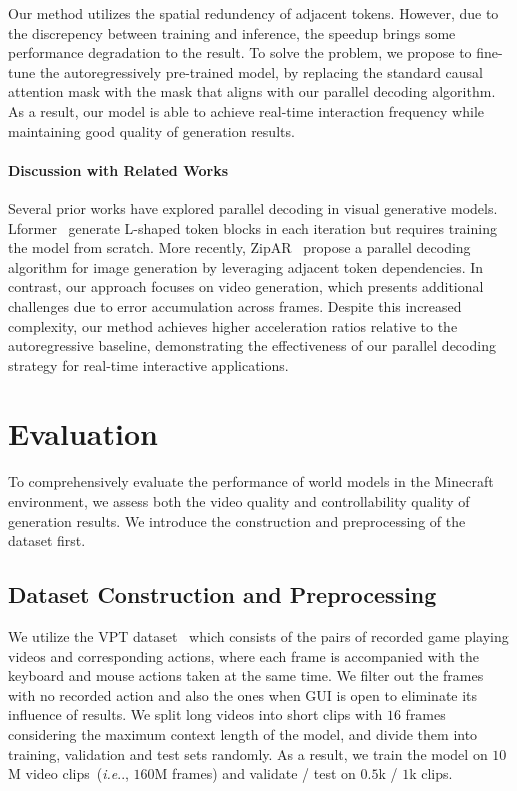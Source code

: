 \documentclass{article} %
\makeatletter
\DeclareRobustCommand\onedot{\futurelet\@let@token\@onedot}
\def\@onedot{\ifx\@let@token.\else.\null\fi\xspace}
\def\ie{\emph{i.e}\onedot} \def\Ie{\emph{I.e}\onedot}
\makeatother
\begin{document}
Our method utilizes the spatial redundency of adjacent tokens. However, due to the discrepency between training and inference, the speedup brings some performance degradation to the result. To solve the problem, we propose to fine-tune the autoregressively pre-trained model, by replacing the standard causal attention mask with the mask that aligns with our parallel decoding algorithm. As a result, our model is able to achieve real-time interaction frequency while maintaining good quality of generation results.

\paragraph{Discussion with Related Works}
Several prior works have explored parallel decoding in visual generative models. Lformer~\citep{li2023lformer} generate L-shaped token blocks in each iteration but requires training the model from scratch. More recently, ZipAR~\citep{he2024zipar} propose a parallel decoding algorithm for image generation by leveraging adjacent token dependencies. In contrast, our approach focuses on video generation, which presents additional challenges due to error accumulation across frames. Despite this increased complexity, our method achieves higher acceleration ratios relative to the autoregressive baseline, demonstrating the effectiveness of our parallel decoding strategy for real-time interactive applications.

\section{Evaluation}
\label{sec:eval}
To comprehensively evaluate the performance of world models in the Minecraft environment, we assess both the video quality and controllability quality of generation results. We introduce the construction and preprocessing of the dataset first.

\subsection{Dataset Construction and Preprocessing}
We utilize the VPT dataset~\citep{baker2022video} which consists of the pairs of recorded game playing videos and corresponding actions, where each frame is accompanied with the keyboard and mouse actions taken at the same time.
We filter out the frames with no recorded action and also the ones when GUI is open to eliminate its influence of results. We split long videos into short clips with $16$  frames considering the maximum context length of the model, and divide them into training, validation and test sets randomly. As a result, we train the model on $10$M video clips~(\ie, $160$M frames) and validate / test on $0.5$k / $1$k clips.
\end{document}
